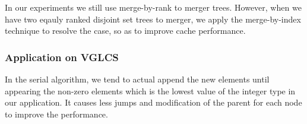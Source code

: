 In our experiments we still use merge-by-rank to merger trees.
However, when we have two eqauly ranked disjoint set trees to merger,
we apply the merge-by-index technique to resolve the case, so as to
improve cache performance.






\subsubsection{Application on VGLCS}


In the serial algorithm, we tend to actual append the new elements until
appearing the non-zero elements which is the lowest value of the integer
type in our application.  It causes less jumps and modification of the
parent for each node to improve the performance.


